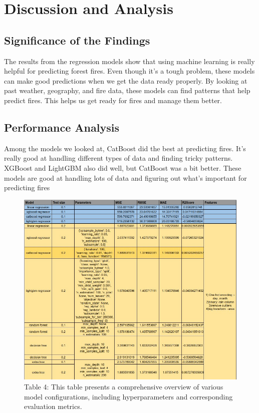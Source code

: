 \chapter{Discussion and Analysis}
\label{ch:evaluation}
\section{Significance of the Findings}
The results from the regression models show that using machine learning is really helpful for predicting forest fires. Even though it's a tough problem, these models can make good predictions when we get the data ready properly. By looking at past weather, geography, and fire data, these models can find patterns that help predict fires. This helps us get ready for fires and manage them better.

\section{Performance Analysis}
Among the models we looked at, CatBoost did the best at predicting fires. It's really good at handling different types of data and finding tricky patterns. XGBoost and LightGBM also did well, but CatBoost was a bit better. These models are good at handling lots of data and figuring out what's important for predicting fires

\begin{figure}[ht]
    \centering
    \includegraphics[scale=0.8]{figures/Comprehensive overview of various model configurations.jpg}
    \caption{Table 4: This table presents a comprehensive overview of various model configurations, including hyperparameters and corresponding evaluation metrics.}
    \label{fig:example-02}
\end{figure}


